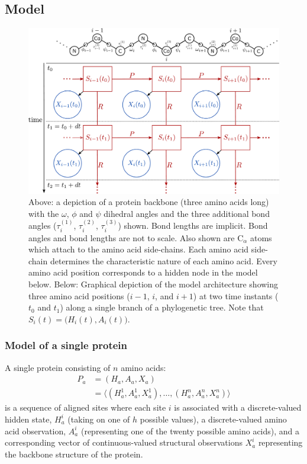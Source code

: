\documentclass[nogrid]{MBE}%
\begin{document}
\subsection{Model}
\begin{figure}
	\centering
	\includegraphics[width=1.75\columnwidth]{figures/model-structure-alt-final.pdf}
	\caption{Above: a depiction of a protein backbone (three amino acids long) with the $\omega$, $\phi$ and $\psi$ dihedral angles and the three additional bond angles ($\tau^{(1)}_{i}$, $\tau^{(2)}_{i}$, $\tau^{(3)}_{i}$) shown. Bond lengths are implicit. Bond angles and bond lengths are not to scale. Also shown are $\text{C}_{\alpha}$ atoms which attach to the amino acid side-chains. Each amino acid side-chain determines the characteristic nature of each amino acid. Every amino acid position corresponds to a hidden node in the model below.\newline
	Below: Graphical depiction of the model architecture showing three amino acid positions ($i-1$, $i$, and $i+1$) at two time instants ($t_0$ and $t_1$) along a single branch of a phylogenetic tree. Note that $S_{i}(t)=\big(H_{i}(t),A_{i}(t)\big)$.}%
	\label{fig:model-structure}%
\end{figure}

\subsubsection{Model of a single protein}
A single protein consisting of $n$ amino acids:
\begin{align*}
 P_a  & = (H_a, A_a, X_a)\\
 & =\langle (H^{1}_a, A^{1}_a,X^{1}_a),\ldots,(H^{n}_a, A^{n}_a,X^{n}_a) \rangle
\end{align*}
is a sequence of aligned sites where each site $i$ is associated with a discrete-valued hidden state, $H_a^{i}$ (taking on one of $h$ possible values), a discrete-valued amino acid observation, $A_a^{i}$ (representing one of the twenty possible amino acids), and a corresponding vector of continuous-valued structural observations $X_a^{i}$ representing the backbone structure of the protein.
\end{document}
